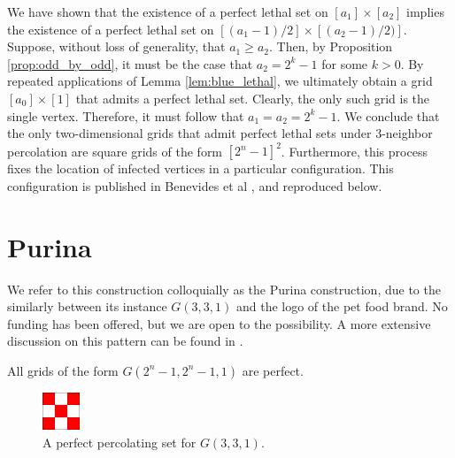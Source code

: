 We have shown that the existence of a perfect lethal set on $[a_1] \times [a_2]$ implies the existence of a perfect lethal set on $[(a_1-1)/2] \times [(a_2-1)/2)]$. Suppose, without loss of generality, that $a_1 \geq a_2$. Then, by Proposition \ref{prop:odd_by_odd}, it must be the case that $a_2 = 2^{k}-1$ for some $k> 0$. By repeated applications of Lemma \ref{lem:blue_lethal}, we ultimately obtain a grid $[a_0] \times [1]$ that admits a perfect lethal set. Clearly, the only such grid is the single vertex. Therefore, it must follow that $a_1 = a_2 = 2^k-1$. We conclude that the only two-dimensional grids that admit perfect lethal sets under 3-neighbor percolation are square grids of the form $[2^n-1]^2$. Furthermore, this process fixes the location of infected vertices in a particular configuration. This configuration is published in Benevides et al \cite{benevides:2021}, and reproduced below.

\section{Purina}

We refer to this construction colloquially as the Purina construction, due to the similarly between its instance $G(3,3,1)$ and the logo of the pet food brand. No funding has been offered, but we are open to the possibility. A more extensive discussion on this pattern can be found in \cite{benevides:2021}.

\begin{con}
\label{con:purina}
All grids of the form $G(2^n-1, 2^n-1, 1)$ are perfect.
\end{con}

\begin{figure}[]
\centering
\includegraphics[width=0.1\textwidth]{figures/7/3x3x1.pdf}
\caption{A perfect percolating set for $G(3,3,1)$.}
\label{fig:3x3x1}
\end{figure} 

